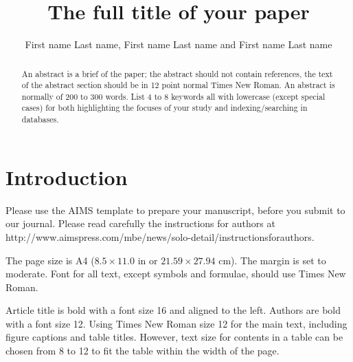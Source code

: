 \documentclass{aims}
\numberwithin{equation}{section}
\begin{document}
\title{The full title of your paper}

\author{%
  First name Last name,
  First name Last name
  and
  First name Last name\corrauth
}


\address{%
  }


\begin{abstract}
An abstract is a brief of the paper; the abstract should not 
contain references, the text of the abstract section should be
in 12 point normal Times New Roman. An abstract is normally of 200 to 300 words. List 4 to 8 keywords all with lowercase (except special cases) for both highlighting the focuses of your study and indexing/searching in databases.

\end{abstract}


\maketitle

\section{Introduction}

Please use the AIMS template to prepare your manuscript, 
before you submit to our journal. 
Please read carefully the instructions for authors at
http://www.aimspress.com/mbe/news/solo-detail/instructionsforauthors. 


The page size is A4 ($8.5 \times 11.0$ in or $21.59 \times 27.94$ cm). The margin is set to moderate. Font for all text, except symbols and formulae, should use Times New Roman. 

Article title is bold with a font size 16 and aligned to the left. Authors are bold with a font size 12. Using Times New Roman size 12 for the main text, including figure captions and table titles. However, text size for contents in a table can be chosen from 8 to 12 to fit the table within the width of the page.
\end{document}
